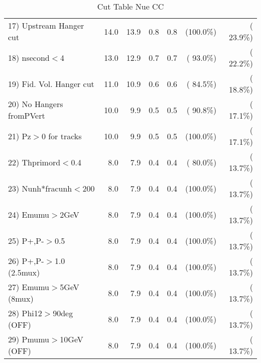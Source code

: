 \begin{table}[h!]
\begin{tabular}{||l||r|r|r|r|r|r||}
 17) Upstream Hanger cut  &         14.0 &         13.9 &          0.8 &          0.8 & (100.0\%) & ( 23.9\%) \\
 18) nsecond$<$4          &         13.0 &         12.9 &          0.7 &          0.7 & ( 93.0\%) & ( 22.2\%) \\
 19) Fid. Vol. Hanger cut &         11.0 &         10.9 &          0.6 &          0.6 & ( 84.5\%) & ( 18.8\%) \\
 20) No Hangers fromPVert &         10.0 &          9.9 &          0.5 &          0.5 & ( 90.8\%) & ( 17.1\%) \\
 21) Pz$>$0 for tracks    &         10.0 &          9.9 &          0.5 &          0.5 & (100.0\%) & ( 17.1\%) \\
 22) Thprimord$<$0.4      &          8.0 &          7.9 &          0.4 &          0.4 & ( 80.0\%) & ( 13.7\%) \\
 23) Nunh*fracunh$<$200   &          8.0 &          7.9 &          0.4 &          0.4 & (100.0\%) & ( 13.7\%) \\
 24) Emumu$>$2GeV         &          8.0 &          7.9 &          0.4 &          0.4 & (100.0\%) & ( 13.7\%) \\
 25) P+,P-$>$0.5          &          8.0 &          7.9 &          0.4 &          0.4 & (100.0\%) & ( 13.7\%) \\
 26) P+,P-$>$1.0 (2.5mux) &          8.0 &          7.9 &          0.4 &          0.4 & (100.0\%) & ( 13.7\%) \\
 27) Emumu$>$5GeV  (8mux) &          8.0 &          7.9 &          0.4 &          0.4 & (100.0\%) & ( 13.7\%) \\
 28) Phi12$>$90deg  (OFF) &          8.0 &          7.9 &          0.4 &          0.4 & (100.0\%) & ( 13.7\%) \\
 29) Pmumu$>$10GeV  (OFF) &          8.0 &          7.9 &          0.4 &          0.4 & (100.0\%) & ( 13.7\%) \\
 \hline
 \hline
 \end{tabular}
 \caption{Cut Table   Nue CC  }
 \label{tab-cutcohjpsi-mumu_nuecc}
 \end{table}
